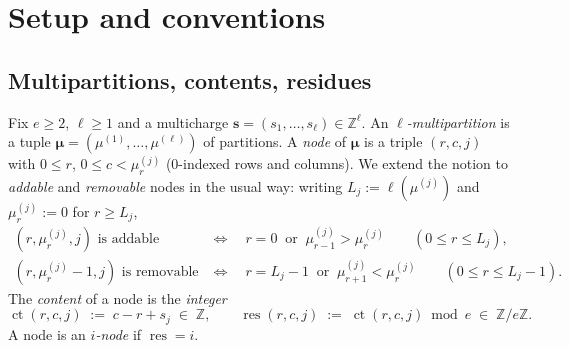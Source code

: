\documentclass[11pt]{article}
\theoremstyle{definition}
\newcommand{\ZZ}{\mathbb{Z}}
\newcommand{\bs}{\mathbf{s}}
\newcommand{\blam}{\boldsymbol{\lambda}}
\newcommand{\bmu}{\boldsymbol{\mu}}
\newcommand{\bemp}{\boldsymbol{\emptyset}}
\newcommand{\Bmi}{B_{-1}}
\newcommand{\ct}{\operatorname{ct}}
\newcommand{\res}{\operatorname{res}}
\begin{document}
\begin{abstract}
We also record what did \emph{not} close. Whether the bound transfers from
$e\blam$ to the Heisenberg descendant
$v^{[\ell]}_{k'} = \Bmi^{k'}|\bemp;\bs\rangle$ depends on a
support hypothesis (H2) which we were unable to test: our implementation
of the level-$\ell$ $q$-wedge straightening rule reproduces all four of
Iijima's worked examples and the entire level-$1$ theory exactly
($79$ partitions, $0$ mismatches), yet is \emph{not confluent} for
$\ell \ge 2$, and no reading inside a searched family of $98{,}304$
variants is both example-consistent and confluent. This is stated
precisely in \S\ref{sec:blocked} as a located, reproducible blocker.

Total computational verification: $239{,}693$ component-word checks,
$1{,}014{,}696$ bound checks, $66{,}464$ sharpness-construction checks,
$497{,}814$ checks of a transposed variant --- all reported below,
$0$ failures against the statements as given.
\end{abstract}

\tableofcontents

\section{Setup and conventions}\label{sec:setup}

\subsection{Multipartitions, contents, residues}

Fix $e \ge 2$, $\ell \ge 1$ and a multicharge $\bs = (s_1,\dots,s_\ell) \in \ZZ^\ell$.
An \emph{$\ell$-multipartition} is a tuple
$\bmu = (\mu^{(1)},\dots,\mu^{(\ell)})$ of partitions. A \emph{node} of
$\bmu$ is a triple $(r,c,j)$ with $0 \le r$, $0 \le c < \mu^{(j)}_r$
($0$-indexed rows and columns). We extend the notion to \emph{addable}
and \emph{removable} nodes in the usual way: writing $L_j := \ell(\mu^{(j)})$
and $\mu^{(j)}_r := 0$ for $r \ge L_j$,
\begin{align*}
 \text{$(r, \mu^{(j)}_r, j)$ is addable} \quad&\Longleftrightarrow\quad
   r = 0 \ \text{ or } \ \mu^{(j)}_{r-1} > \mu^{(j)}_r
   \qquad (0 \le r \le L_j),\\
 \text{$(r, \mu^{(j)}_r - 1, j)$ is removable} \quad&\Longleftrightarrow\quad
   r = L_j - 1 \ \text{ or } \ \mu^{(j)}_{r+1} < \mu^{(j)}_r
   \qquad (0 \le r \le L_j - 1).
\end{align*}
The \emph{content} of a node is the \emph{integer}
\[
  \ct(r,c,j) \;:=\; c - r + s_j \;\in\; \ZZ,
  \qquad
  \res(r,c,j) \;:=\; \ct(r,c,j) \bmod e \;\in\; \ZZ/e\ZZ .
\]
A node is an \emph{$i$-node} if $\res = i$.
\end{document}
